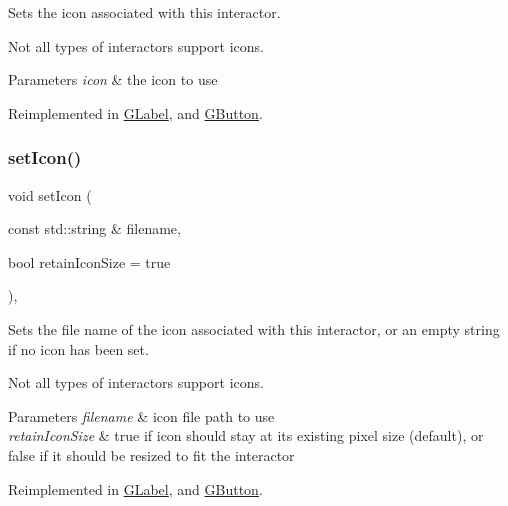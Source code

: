 Sets the icon associated with this interactor. 

Not all types of interactors support icons. 
\begin{DoxyParams}{Parameters}
{\em icon} & the icon to use \\
\hline
\end{DoxyParams}


Reimplemented in \mbox{\hyperlink{classGLabel_acb5275b880ff622d306f8f33428b4e34}{G\+Label}}, and \mbox{\hyperlink{classGButton_acb5275b880ff622d306f8f33428b4e34}{G\+Button}}.

\mbox{\label{classGInteractor_a762e139aa311461c3984d3ad28293f64}} 
\subsubsection{\texorpdfstring{set\+Icon()}{setIcon()}\hspace{0.1cm}{\footnotesize\ttfamily [3/3]}}
{\footnotesize\ttfamily void set\+Icon (\begin{DoxyParamCaption}\item[{const std\+::string \&}]{filename,  }\item[{bool}]{retain\+Icon\+Size = {\ttfamily true} }\end{DoxyParamCaption})\hspace{0.3cm}{\ttfamily [virtual]}, {\ttfamily [inherited]}}



Sets the file name of the icon associated with this interactor, or an empty string if no icon has been set. 

Not all types of interactors support icons. 
\begin{DoxyParams}{Parameters}
{\em filename} & icon file path to use \\
\hline
{\em retain\+Icon\+Size} & true if icon should stay at its existing pixel size (default), or false if it should be resized to fit the interactor \\
\hline
\end{DoxyParams}


Reimplemented in \mbox{\hyperlink{classGLabel_abbefcb1f611af273755c7e1cca921497}{G\+Label}}, and \mbox{\hyperlink{classGButton_abbefcb1f611af273755c7e1cca921497}{G\+Button}}.

\mbox{\label{classGInteractor_aeb8324d3287fa1fbe093f4d6230cf0a6}} 
